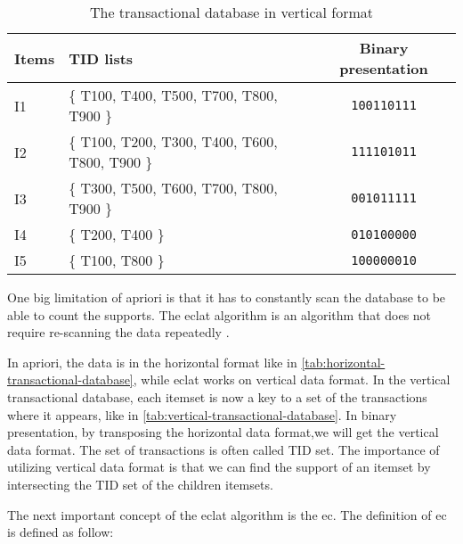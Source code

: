 \begin{table}[]
    \centering
    \begin{tabular}{|l|l|c|}
        \hline
        \textbf{Items}   & \textbf{TID lists}                             & \textbf{Binary presentation} \\ \hline
        I1               & \{ T100, T400, T500, T700, T800, T900 \}       & \texttt{100110111}           \\ \hline
        I2               & \{ T100, T200, T300, T400, T600, T800, T900 \} & \texttt{111101011}           \\ \hline
        I3               & \{ T300, T500, T600, T700, T800, T900 \}       & \texttt{001011111}           \\ \hline
        I4               & \{ T200, T400 \}                               & \texttt{010100000}           \\ \hline
        I5               & \{ T100, T800 \}                               & \texttt{100000010}           \\ \hline
        \end{tabular}
    \caption{The transactional database in vertical format \citep{han2012mining}}
    \label{tab:vertical-transactional-database}
\end{table}

One big limitation of \acl*{apriori} is that it has to constantly scan the database to be able to count the supports.
The \ac{eclat} algorithm is an algorithm that does not require re-scanning the data repeatedly \citep{zaki1997}.

In \acl{apriori}, the data is in the horizontal format like in \autoref{tab:horizontal-transactional-database}, while \ac{eclat} works on vertical data format.
In the vertical transactional database, each itemset is now a key to a set of the transactions where it appears, like in \autoref{tab:vertical-transactional-database}.
In binary presentation, by transposing the horizontal data format,we will get the vertical data format.
The set of transactions is often called \ac{TID} set.
The importance of utilizing vertical data format is that we can find the support of an itemset by intersecting the \ac{TID} set of the children itemsets.

The next important concept of the \ac{eclat} algorithm is the \ac{ec}. The definition of \acl{ec} is defined as follow:

